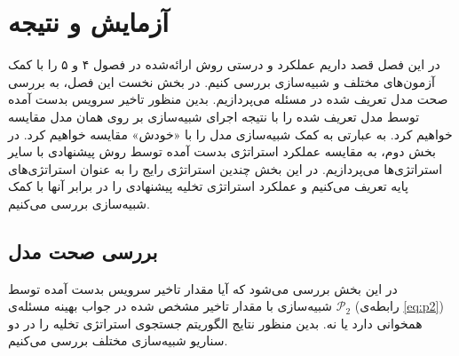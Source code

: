 \chapter{آزمایش و نتیجه}
در این فصل قصد داریم عملکرد و درستی روش ارائه‌شده در فصول ۴ و ۵ را با کمک آزمون‌های مختلف و شبیه‌سازی بررسی کنیم. در بخش نخست این فصل، به بررسی صحت مدل تعریف شده در مسئله می‌پردازیم. بدین منظور تاخیر سرویس بدست آمده توسط مدل تعریف شده را با نتیجه اجرای شبیه‌سازی بر روی همان مدل مقایسه خواهیم کرد. به عبارتی به کمک شبیه‌سازی مدل را با «خودش» مقایسه خواهیم کرد. در بخش دوم، به مقایسه عملکرد استراتژی بدست آمده توسط روش پیشنهادی با سایر استراتژی‌ها می‌پردازیم. در این بخش چندین استراتژی رایج را به عنوان استراتژی‌های پایه تعریف می‌کنیم و عملکرد استراتژی تخلیه پیشنهادی را در برابر آنها با کمک شبیه‌سازی بررسی می‌کنیم.
\section{بررسی صحت مدل}
در این بخش بررسی می‌شود که آیا مقدار تاخیر سرویس بدست آمده توسط شبیه‌سازی با مقدار تاخیر مشخص شده در جواب بهینه مسئله‌ی 
$\mathcal{P}_2$
 (رابطه‌ی \ref{eq:p2}) همخوانی دارد یا نه. بدین منظور نتایج الگوریتم جستجوی استراتژی تخلیه را در دو سناریو شبیه‌سازی مختلف بررسی می‌کنیم.
